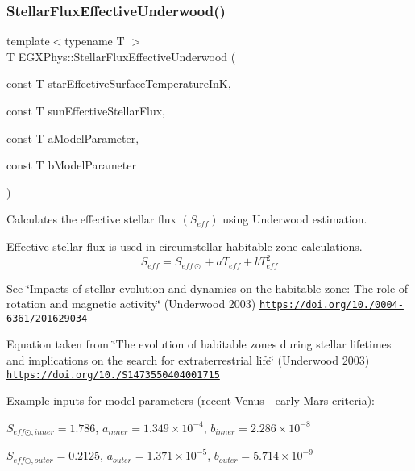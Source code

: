 \subsubsection{\texorpdfstring{Stellar\+Flux\+Effective\+Underwood()}{StellarFluxEffectiveUnderwood()}}
{\footnotesize\ttfamily template$<$typename T $>$ \\
T E\+G\+X\+Phys\+::\+Stellar\+Flux\+Effective\+Underwood (\begin{DoxyParamCaption}\item[{const T}]{star\+Effective\+Surface\+Temperature\+InK,  }\item[{const T}]{sun\+Effective\+Stellar\+Flux,  }\item[{const T}]{a\+Model\+Parameter,  }\item[{const T}]{b\+Model\+Parameter }\end{DoxyParamCaption})}



Calculates the effective stellar flux $(S_{eff})$ using Underwood estimation. 

Effective stellar flux is used in circumstellar habitable zone calculations. \[S_{eff}=S_{eff\odot}+aT_{eff}+bT^2_{eff}\]

See \char`\"{}\+Impacts of stellar evolution and dynamics on the habitable zone\+: The role of rotation and magnetic activity\char`\"{} (Underwood 2003) \href{https://doi.org/10.1051/0004-6361/201629034}{\tt https\+://doi.\+org/10./0004-\/6361/201629034}

Equation taken from \char`\"{}\+The evolution of habitable zones during stellar lifetimes and implications on the search for extraterrestrial life\char`\"{} (Underwood 2003) \href{https://doi.org/10.1017/S1473550404001715}{\tt https\+://doi.\+org/10./\+S1473550404001715}

Example inputs for model parameters (recent Venus -\/ early Mars criteria)\+:

$S_{eff\odot,inner} = 1.786$, $a_{inner} = 1.349 \times 10^{-4}$, $b_{inner} = 2.286 \times 10^{-8}$

$S_{eff\odot,outer} = 0.2125$, $a_{outer} = 1.371 \times 10^{-5}$, $b_{outer} = 5.714 \times 10^{-9}$


